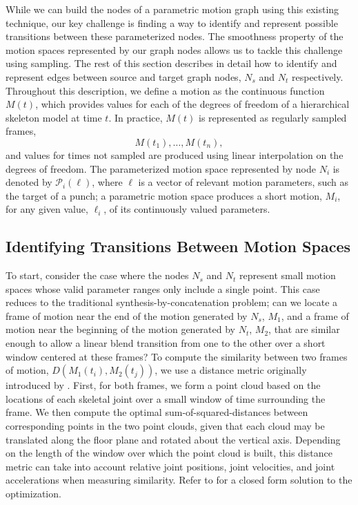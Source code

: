 \documentclass[10pt,twocolumn]{article}
\begin{document}
While we can build the nodes of a parametric motion graph using this existing technique, our key challenge is finding a way to identify and represent possible transitions between these parameterized nodes. The smoothness property of the motion spaces represented by our graph nodes allows us to tackle this challenge using sampling. The rest of this section describes in detail how to identify and represent edges between source and target graph nodes, $N_s$ and $N_t$ respectively. Throughout this description, we define a motion as the continuous function $M(t)$, which provides values for each of the degrees of freedom of a hierarchical skeleton model at time $t$. In practice, $M(t)$ is represented as regularly sampled frames,
\[
M(t_1), \ldots, M(t_n),
\]
and values for times not sampled are produced using linear interpolation on the degrees of freedom. The parameterized motion space represented by node $N_i$ is denoted by $\mathcal{P}_i(\ell)$, where $\ell$ is a vector of relevant motion parameters, such as the target of a punch; a parametric motion space produces a short motion, $M_i$, for any given value, $\ell_i$, of its continuously valued parameters.

\subsection{Identifying Transitions Between Motion Spaces}

To start, consider the case where the nodes $N_s$ and $N_t$ represent small motion spaces whose valid parameter ranges only include a single point. This case reduces to the traditional synthesis-by-concatenation problem; can we locate a frame of motion near the end of the motion generated by $N_s$, $M_1$, and a frame of motion near the beginning of the motion generated by $N_t$, $M_2$, that are similar enough to allow a linear blend transition from one to the other over a short window centered at these frames? To compute the similarity between two frames of motion, $D(M_1(t_i),M_2(t_j))$, we use a distance metric originally introduced by \citet{kovar2002}. First, for both frames, we form a point cloud based on the locations of each skeletal joint over a small window of time surrounding the frame. We then compute the optimal sum-of-squared-distances between corresponding points in the two point clouds, given that each cloud may be translated along the floor plane and rotated about the vertical axis. Depending on the length of the window over which the point cloud is built, this distance metric can take into account relative joint positions, joint velocities, and joint accelerations when measuring similarity. Refer to \citet{kovar2002} for a closed form solution to the optimization.
\end{document}

